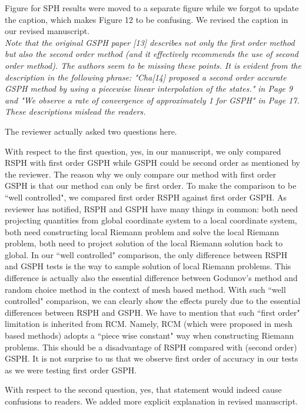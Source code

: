 \documentclass[10pt,a4paper]{article}
\begin{document}
Figure for SPH results were moved to a separate figure while we forgot to update the caption, which makes Figure 12 to be confusing. We revised the caption in our revised manuscript.
\\[3pt]


\textit{Note that the original GSPH paper [13] describes not only the first order method but also the second order method (and it effectively recommends the use of second order method). The authors seem to be missing these points. It is evident from the description in the following phrase: "Cha[14] proposed a second order accurate GSPH method by using a piecewise linear interpolation of the states." in Page 9 and "We observe a rate of convergence of approximately 1 for GSPH" in Page 17. These descriptions mislead the readers.}

The reviewer actually asked two questions here.
 
With respect to the first question, yes, in our manuscript, we only compared RSPH with first order GSPH while GSPH could be second order as mentioned by the reviewer. The reason why we only compare our method with first order GSPH is that our method can only be first order. To make the comparison to be ``well controlled", we compared first order RSPH against first order GSPH. As reviewer has notified, RSPH and GSPH have many things in common: both need projecting quantities from global coordinate system to a local coordinate system, both need constructing local Riemann problem and solve the local Riemann problem, both need to project solution of the local Riemann solution back to global. In our ``well controlled" comparison, the only difference between RSPH and GSPH tests is the way to sample solution of local Riemann problems. This difference is actually also the essential difference between Godunov's method and random choice method in the context of mesh based method. With such ``well controlled" comparison, we can clearly show the effects purely due to the essential differences between RSPH and GSPH. We have to mention that such ``first order" limitation is inherited from RCM. Namely, RCM (which were proposed in mesh based methods) adopts a ``piece wise constant" way when constructing Riemann problems. This should be a disadvantage of RSPH compared with (second order) GSPH.
It is not surprise to us that we observe first order of accuracy in our tests as we were testing first order GSPH.

With respect to the second question, yes, that statement would indeed cause confusions to readers. We added more explicit explanation in revised manuscript.
\\[3pt]
\end{document}
